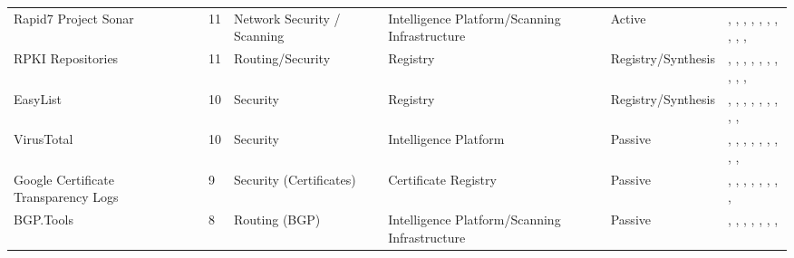 \begin{table}[h!]
\begin{tabular}{lllllll}
Rapid7 Project Sonar & \cite{rapid7_sonar} & 11 & Network Security / Scanning & Intelligence Platform/Scanning Infrastructure & Active & \cite{10.1145/3517745.3561424}, \cite{10.1145/3487552.3487833}, \cite{10.1007/978-3-030-98785-5_3}, \cite{10.1007/978-3-031-28486-1_4}, \cite{10.1145/3646547.3688449}, \cite{10.1007/978-3-030-72582-2_17}, \cite{10.1007/978-3-031-85960-1_3}, \cite{10.1145/3517745.3561443}, \cite{10.1007/978-3-031-56252-5_4}, \cite{10.1007/978-3-031-28486-1_21}, \cite{10.1145/3777912.3839791} \\
RPKI Repositories & \cite{riperpkiarchive} & 11 & Routing/Security & Registry & Registry/Synthesis & \cite{10.1145/3730567.3732917}, \cite{10.1145/3646547.3688444}, \cite{10.1145/3618257.3624819}, \cite{10.1145/3618257.3624817}, \cite{10.1145/3517745.3561419}, \cite{10.1145/3517745.3561454}, \cite{10.1007/978-3-030-98785-5_14}, \cite{10.1007/978-3-031-28486-1_18}, \cite{10.1007/978-3-031-56252-5_5}, \cite{10.1007/978-3-032-18268-5_2}, \cite{10.1145/3777912.3839812} \\
EasyList & \cite{easylist} & 10 & Security & Registry & Registry/Synthesis & \cite{10.1145/3730567.3764427}, \cite{10.1145/3618257.3624823}, \cite{10.1145/3517745.3561460}, \cite{10.1145/3487552.3487850}, \cite{10.1145/3487552.3487855}, \cite{10.1007/978-3-030-72582-2_7}, \cite{10.1145/3777912.3839788}, \cite{10.1145/3777912.3839794}, \cite{10.1145/3777912.3839818}, \cite{10.1145/3777912.3839794} \\
VirusTotal & \cite{virustotal} & 10 & Security & Intelligence Platform & Passive & \cite{10.1145/3618257.3624812}, \cite{10.1145/3618257.3624800}, \cite{10.1145/3618257.3624839}, \cite{10.1145/3517745.3561463}, \cite{10.1145/3487552.3487833}, \cite{10.1007/978-3-030-72582-2_3}, \cite{10.1007/978-3-031-56249-5_6}, \cite{10.1145/3777912.3809148}, \cite{10.1145/3777912.3839787}, \cite{10.1145/3777912.3809151} \\
Google Certificate Transparency Logs & \cite{googlectlogs} & 9 & Security (Certificates) & Certificate Registry & Passive & \cite{10.1145/3646547.3689017}, \cite{10.1145/3618257.3624835}, \cite{10.1145/3618257.3624797}, \cite{10.1007/978-3-030-72582-2_10}, \cite{10.1145/3618257.3624802}, \cite{10.1007/978-3-031-28486-1_4}, \cite{10.1007/978-3-031-56249-5_9}, \cite{10.1007/978-3-031-56249-5_10}, \cite{10.1145/3777912.3809157} \\
BGP.Tools & \cite{bgptools} & 8 & Routing (BGP) & Intelligence Platform/Scanning Infrastructure & Passive & \cite{10.1145/3646547.3688444}, \cite{10.1007/978-3-031-28486-1_15}, \cite{10.1007/978-3-031-28486-1_21}, \cite{10.1007/978-3-032-18268-5_2}, \cite{10.1145/3777912.3839828}, \cite{10.1145/3777912.3839800}, \cite{10.1145/3777912.3839785}, \cite{10.1145/3777912.3839812} \\

\end{tabular}
\end{table}
